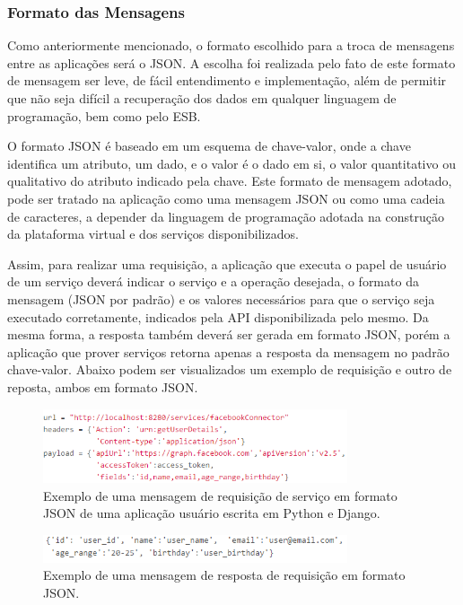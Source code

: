 \subsubsection{Formato das Mensagens}
Como anteriormente mencionado, o formato escolhido para a troca de mensagens entre as aplicações será o JSON. A escolha foi realizada pelo fato de este formato de mensagem ser leve, de fácil entendimento e implementação, além de permitir que não seja difícil a recuperação dos dados em qualquer linguagem de programação, bem como pelo ESB.

O formato JSON é baseado em um esquema de chave-valor, onde a chave identifica um atributo, um dado, e o valor é o dado em si, o valor quantitativo ou qualitativo do atributo indicado pela chave. Este formato de mensagem adotado, pode ser tratado na aplicação como uma mensagem JSON ou como uma cadeia de caracteres, a depender da linguagem de programação adotada na construção da plataforma virtual e dos serviços disponibilizados.

Assim, para realizar uma requisição, a aplicação que executa o papel de usuário de um serviço deverá indicar o serviço e a operação desejada, o formato da mensagem (JSON por padrão) e os valores necessários para que o serviço seja executado corretamente, indicados pela API disponibilizada pelo mesmo. Da mesma forma, a resposta também deverá ser gerada em formato JSON, porém a aplicação que prover serviços retorna apenas a resposta da mensagem no padrão chave-valor. Abaixo podem ser visualizados um exemplo de requisição e outro de reposta, ambos em formato JSON.

\begin{figure}[htb]
\centering
\includegraphics[width=0.8\textwidth]{figuras/mensagem_requisicao.png}
\caption{Exemplo de uma mensagem de requisição de serviço em formato JSON de uma aplicação usuário escrita em Python e Django.}
\label{mensagem_requisicao}
\end{figure}

\begin{figure}[htb]
\centering
\includegraphics[width=0.8\textwidth]{figuras/mensagem_resposta.png}
\caption{Exemplo de uma mensagem de resposta de requisição em formato JSON.}
\label{mensagem_resposta}
\end{figure}

